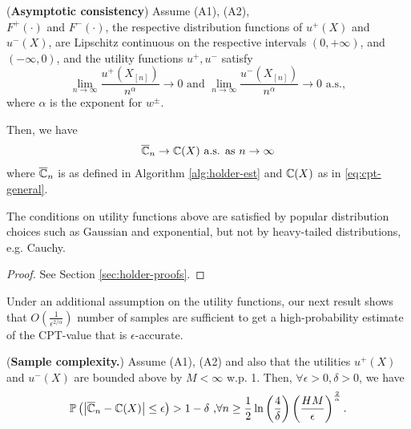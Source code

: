 \begin{proposition}(\textbf{Asymptotic consistency})
\label{prop:holder-asymptotic}
Assume (A1), (A2),\\
$F^+(\cdot)$ and $F^-(\cdot)$, the respective distribution functions of $u^+(X)$ and $u^-(X)$, 
are Lipschitz continuous on the respective intervals $(0,+\infty)$, and 
$(-\infty, 0)$, and  the utility functions $u^+, u^-$ satisfy 
$$\lim\limits_{n\rightarrow\infty}\frac{u^+(X_{[n]})}{n^{\alpha}}\rightarrow 0 \text{ and }\lim\limits_{n\rightarrow\infty}\frac{u^-(X_{[n]})}{n^{\alpha}}\rightarrow 0 \text{ a.s.},$$
where $\alpha$ is the \holder exponent for $w^{\pm}$.

Then, we have 
\begin{align}
\overline {\mathbb{C}}_n
\rightarrow
\mathbb{C}(X)
 \text{   a.s. as } n\rightarrow \infty
\end{align}
where $\overline {\mathbb{C}}_n$ is as defined in Algorithm \ref{alg:holder-est} and $\mathbb{C}(X)$ as in \eqref{eq:cpt-general}.
\end{proposition}
The conditions on utility functions above are satisfied by popular distribution choices such as Gaussian and exponential, but not by heavy-tailed distributions, e.g. Cauchy.
\begin{proof}
See Section \ref{sec:holder-proofs}. 
\end{proof}
Under an additional assumption on the utility functions,
our next result shows that $O\left(\frac{1}{\epsilon^{2/\alpha}}\right)$ number of samples are sufficient to get a
high-probability estimate of the CPT-value that is $\epsilon$-accurate.
\begin{proposition}(\textbf{Sample complexity.})
\label{prop:holder-dkw}
Assume (A1), (A2) and also that the utilities $u^+(X)$ and $u^-(X)$ are bounded above by $M<\infty$ w.p. 1. Then, $\forall \epsilon >0, \delta >0$, we have
$$
\mathbb{P}\left( \left |\overline {\mathbb{C}}_n- \mathbb{C}(X) \right| \leq  \epsilon  \right) >1- \delta\text{     ,} \forall n \geq \frac{1}{2}\ln\left(\frac{4}{\delta}\right)
\left(\frac{HM}{\epsilon}\right)^{\frac{2}{\alpha}}.$$
\end{proposition}


